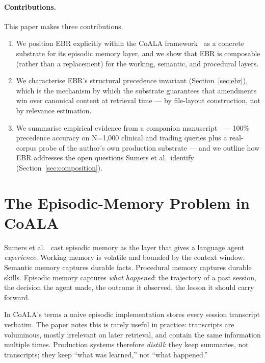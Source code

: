 \documentclass[11pt,a4paper]{article}
\begin{document}
\paragraph{Contributions.} This paper makes three contributions.
\begin{enumerate}[leftmargin=2em,itemsep=2pt]
  \item We position EBR explicitly within the CoALA
        framework~\cite{sumers2024coala} as a concrete substrate for its episodic
        memory layer, and we show that EBR is composable (rather than a replacement)
        for the working, semantic, and procedural layers.
  \item We characterise EBR's structural precedence invariant (Section~\ref{sec:ebr}),
        which is the mechanism by which the substrate guarantees that amendments
        win over canonical content at retrieval time --- by file-layout
        construction, not by relevance estimation.
  \item We summarise empirical evidence from a companion manuscript~\cite{anthony2026ebr}
        --- 100\% precedence accuracy on N=1{,}000 clinical and trading queries plus
        a real-corpus probe of the author's own production substrate --- and we
        outline how EBR addresses the open questions Sumers et al.\ identify
        (Section~\ref{sec:composition}).
\end{enumerate}

\section{The Episodic-Memory Problem in CoALA}
\label{sec:problem}

\noindent
Sumers et al.~\cite{sumers2024coala} cast episodic memory as the layer that gives a
language agent \emph{experience}. Working memory is volatile and bounded by the context
window. Semantic memory captures durable facts. Procedural memory captures durable
skills. Episodic memory captures \emph{what happened}: the trajectory of a past session,
the decision the agent made, the outcome it observed, the lesson it should carry forward.

In CoALA's terms a naive episodic implementation stores every session transcript
verbatim. The paper notes this is rarely useful in practice: transcripts are voluminous,
mostly irrelevant on later retrieval, and contain the same information multiple times.
Production systems therefore \emph{distill}: they keep summaries, not transcripts; they
keep ``what was learned,'' not ``what happened.''
\end{document}

